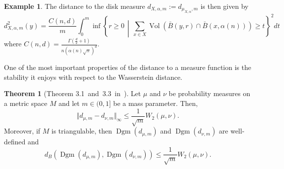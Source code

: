 \documentclass[10pt,a4paper]{article}
\theoremstyle{definition}
\newtheorem{thm}{Theorem}[section]
\newtheorem{ex}{Example}[thm]
\begin{document}
	\begin{ex}
	The distance to the disk measure $d_{X,\alpha, m} := d_{\mu_{X,\alpha}, m}$ is then given by
	$$
	d_{X,\alpha, m}^2(y) = \frac{C(n,d)}{m}\int_0^m\inf\left\{r\geq 0\,\middle\vert\,\sum_{x\in X}\operatorname{Vol}(\bar{B}(y,r)\cap\bar{B}(x,\alpha(n)))\geq t\right\}^2 dt
	$$
	where $C(n,d)=\frac{\Gamma(\frac{d}{2}+1)}{n(\alpha(n)\sqrt{\pi})^d}$.
	\end{ex}

	One of the most important properties of the distance to a measure function is the stability it enjoys with respect to the Wasserstein distance.
	\begin{thm}[Theorem 3.1~and~3.3~in~\autocite{Buchet2013}]
		Let $\mu$ and $\nu$ be probability measures on a metric space $M$ and let $m\in(0,1]$ be a mass parameter. Then,
		$$
		\Vert d_{\mu,m} - d_{\nu,m}\Vert_\infty\leq\frac{1}{\sqrt{m}}W_2(\mu, \nu).
		$$
		Moreover, if $M$ is triangulable, then $\operatorname{Dgm}(d_{\mu, m})$ and $\operatorname{Dgm}(d_{\nu, m})$ are well-defined and
		$$
		d_B(\operatorname{Dgm}(d_{\mu, m}), \operatorname{Dgm}(d_{\nu, m}))\leq\frac{1}{\sqrt{m}}W_2(\mu,\nu).
		$$
	\end{thm}

\end{document}
